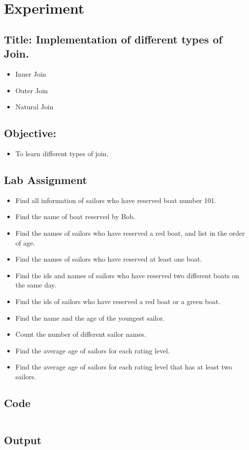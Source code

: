 \documentclass{article}
\begin{document}
\section*{Experiment \jobname}
\subsection*{\textbf{Title:} Implementation of different types of Join.}
\begin{itemize}
	\item Inner Join
	\item Outer Join
	\item Natural Join
\end{itemize}
\subsection*{\textbf{Objective:}}
\begin{itemize}
	\item To learn different types of join.
\end{itemize}
\subsection*{Lab Assignment}
\begin{itemize}
	\item Find all information of sailors who have reserved boat number 101.
	\item Find the name of boat reserved by Bob.
	\item Find the names of sailors who have reserved a red boat, and list in the order of age.
	\item Find the names of sailors who have reserved at least one boat.
	\item Find the ids and names of sailors who have reserved two different boats on the same day.
	\item Find the ids of sailors who have reserved a red boat or a green boat.
	\item Find the name and the age of the youngest sailor.
	\item Count the number of different sailor names.
	\item Find the average age of sailors for each rating level.
	\item Find the average age of sailors for each rating level that has at least two sailors.
\end{itemize}
\subsection*{Code}
\inputminted{sql}{code/\jobname.sql}
\subsection*{Output}

\end{document}
